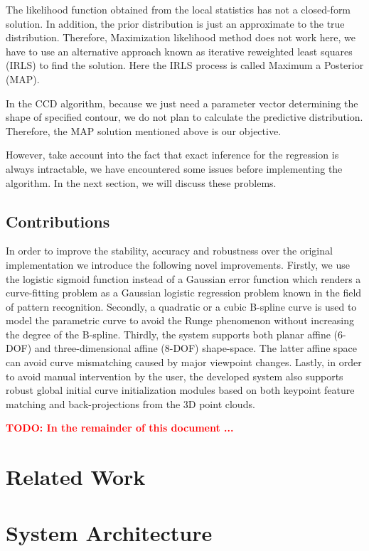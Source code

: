 \documentclass[conference]{IEEEtran}
\newcommand{\todo}[1]{\textbf{\textcolor{red}{TODO: #1}}}
\begin{document}
The likelihood function obtained from the local statistics has
not a closed-form solution. In addition, the prior distribution is just
an approximate to the true distribution. Therefore, Maximization
likelihood method does not work here, we have to use an alternative
approach known as iterative reweighted least squares (IRLS) to find
the solution. Here the IRLS process is called Maximum a Posterior (MAP).

In the CCD algorithm, because we just need a parameter vector determining
the shape of specified contour, we do not plan to calculate the
predictive distribution. Therefore, the MAP solution mentioned above
is our objective.

However, take account into the fact that exact inference for the
regression is always intractable, we have encountered some issues before
implementing the algorithm. In the next section, we will discuss these
problems.

\subsection{Contributions}
In order to improve the stability, accuracy and robustness over the original
implementation we introduce the following novel improvements. Firstly, we use the logistic sigmoid
function instead of a Gaussian error function which renders a
curve-fitting problem as a Gaussian logistic regression problem known in the
field of pattern recognition. Secondly, a quadratic or
a cubic B-spline curve is used to model the parametric curve
to avoid the Runge phenomenon without increasing the degree of the
B-spline. Thirdly, the system supports both planar affine (6-DOF) and
three-dimensional affine (8-DOF) shape-space. The latter affine space can avoid
curve mismatching caused by major viewpoint changes. Lastly, in
order to avoid manual intervention by the user, the developed system
also supports robust global initial curve initialization modules based on both keypoint
feature matching and back-projections from the 3D point clouds.

\todo{In the remainder of this document ...}
\section{Related Work}
\cite{hanek2004contracting}

\section{System Architecture}
\end{document}
